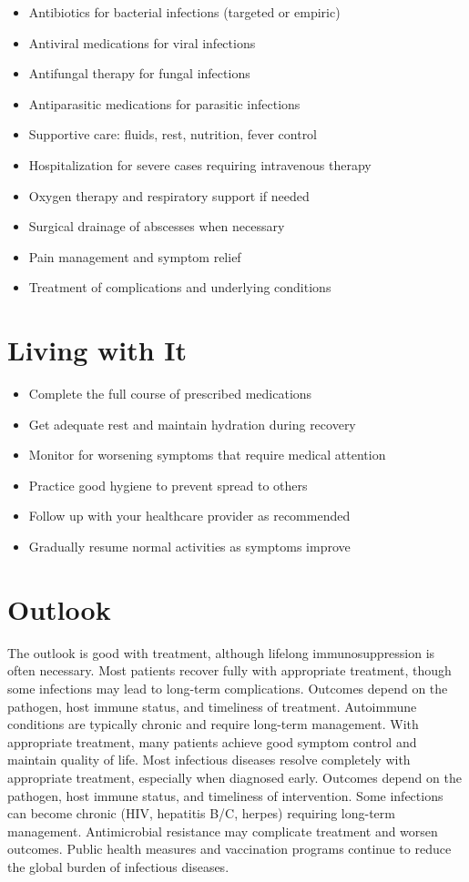 \begin{itemize}[noitemsep]
  \item Antibiotics for bacterial infections (targeted or empiric)
  \item Antiviral medications for viral infections
  \item Antifungal therapy for fungal infections
  \item Antiparasitic medications for parasitic infections
  \item Supportive care: fluids, rest, nutrition, fever control
  \item Hospitalization for severe cases requiring intravenous therapy
  \item Oxygen therapy and respiratory support if needed
  \item Surgical drainage of abscesses when necessary
  \item Pain management and symptom relief
  \item Treatment of complications and underlying conditions
\end{itemize}
\section{Living with It}
\begin{itemize}[noitemsep]
  \item Complete the full course of prescribed medications
  \item Get adequate rest and maintain hydration during recovery
  \item Monitor for worsening symptoms that require medical attention
  \item Practice good hygiene to prevent spread to others
  \item Follow up with your healthcare provider as recommended
  \item Gradually resume normal activities as symptoms improve
\end{itemize}
\section{Outlook}
The outlook is good with treatment, although lifelong immunosuppression is often necessary. Most patients recover fully with appropriate treatment, though some infections may lead to long-term complications. Outcomes depend on the pathogen, host immune status, and timeliness of treatment. Autoimmune conditions are typically chronic and require long-term management. With appropriate treatment, many patients achieve good symptom control and maintain quality of life. Most infectious diseases resolve completely with appropriate treatment, especially when diagnosed early. Outcomes depend on the pathogen, host immune status, and timeliness of intervention. Some infections can become chronic (HIV, hepatitis B/C, herpes) requiring long-term management. Antimicrobial resistance may complicate treatment and worsen outcomes. Public health measures and vaccination programs continue to reduce the global burden of infectious diseases.
